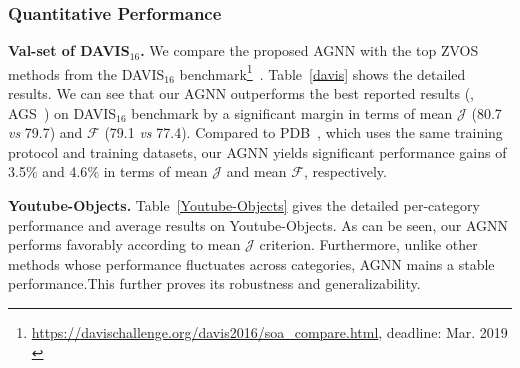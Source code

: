 \documentclass[10pt,twocolumn,letterpaper]{article}
\begin{document}
\subsubsection{Quantitative Performance}\label{sec:exqUVOS}
\vspace*{-4pt}
\noindent\textbf{Val-set of DAVIS$_{16}$.}
We compare the proposed AGNN with the top ZVOS methods from the DAVIS$_{16}$ benchmark\footnote{\scriptsize{\url{https://davischallenge.org/davis2016/soa_compare.html}, deadline: Mar. 2019 }\label{web}}~\cite{perazzi2016benchmark}. Table~\ref{davis} shows the detailed results. We can see that our AGNN outperforms the best reported results (\ie, AGS~\cite{wang2019learning}) on DAVIS$_{16}$ benchmark by a significant margin in terms of mean $\mathcal{J}$ (80.7 \textit{vs} 79.7) and $\mathcal{F}$ (79.1 \textit{vs} 77.4). Compared to  PDB~\cite{Song_2018_ECCV}, which uses the same training protocol and training datasets, our AGNN yields significant performance gains of 3.5$\%$ and 4.6$\%$ in terms of mean $\mathcal{J}$ and mean $\mathcal{F}$, respectively.









\noindent\textbf{Youtube-Objects.} Table~\ref{Youtube-Objects} gives the detailed per-category performance and average results on Youtube-Objects. As can be seen, our AGNN performs favorably according to mean $\mathcal{J}$ criterion. Furthermore, unlike other methods whose performance fluctuates across categories, AGNN mains a stable performance.This further proves its robustness and generalizability.
\end{document}
